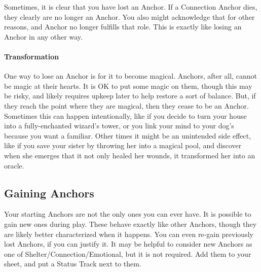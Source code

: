 \documentclass[
  oneside,
  statementpaper,
  9pt]{memoir}
\begin{document}
\begin{Player}

Sometimes, it is clear that you have lost an Anchor. If a Connection Anchor dies, they clearly are no longer an Anchor. You also might acknowledge that for other reasons, and Anchor no longer fulfills that role. This is exactly like losing an Anchor in any other way.

\end{Player}

\hypertarget{transformation}{%
\paragraph{Transformation}\label{transformation}}

\begin{Player}

One way to lose an Anchor is for it to become magical. Anchors, after all, cannot be magic at their hearts. It is OK to put some magic on them, though this may be risky, and likely requires upkeep later to help restore a sort of balance. But, if they reach the point where they are magical, then they cease to be an Anchor. Sometimes this can happen intentionally, like if you decide to turn your house into a fully-enchanted wizard’s tower, or you link your mind to your dog’s because you want a familiar. Other times it might be an unintended side effect, like if you save your sister by throwing her into a magical pool, and discover when she emerges that it not only healed her wounds, it transformed her into an oracle.

\end{Player}

\hypertarget{gaining-anchors}{%
\subsection{Gaining Anchors}\label{gaining-anchors}}

\begin{Player}

Your starting Anchors are not the only ones you can ever have. It is possible to gain new ones during play. These behave exactly like other Anchors, though they are likely better characterized when it happens. You can even re-gain previously lost Anchors, if you can justify it. It may be helpful to consider new Anchors as one of Shelter/Connection/Emotional, but it is not required. Add them to your sheet, and put a Status Track next to them.

\end{Player}
\end{document}
